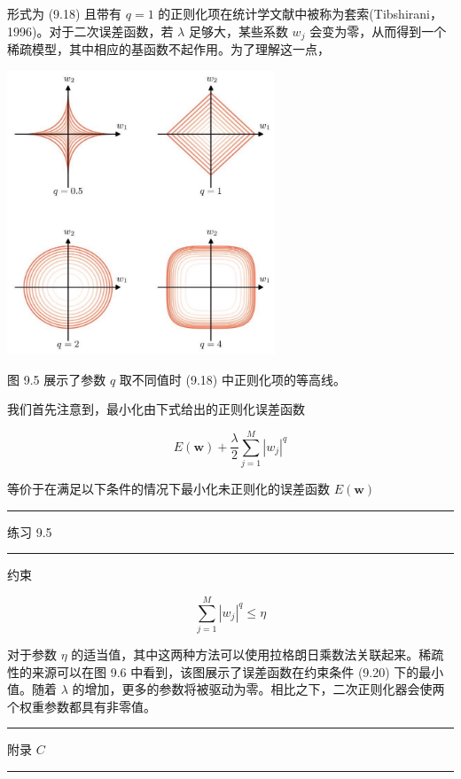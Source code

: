 \documentclass[10pt]{report}
\newcommand{\HRule}{\begin{center}\rule{0.9\linewidth}{0.2mm}\end{center}}
\begin{document}
形式为 (9.18) 且带有 \(q = 1\) 的正则化项在统计学文献中被称为套索(Tibshirani，1996)。对于二次误差函数，若 \(\lambda\) 足够大，某些系数 \({w}_{j}\) 会变为零，从而得到一个稀疏模型，其中相应的基函数不起作用。为了理解这一点，

\begin{center}
\includegraphics[max width=0.6\textwidth]{images/0194e279-9b28-703a-88f4-c3ac21e2010d_284_687_349_782_829_0.jpg}
\end{center}
\hspace*{3em} 

图 9.5 展示了参数 \(q\) 取不同值时 (9.18) 中正则化项的等高线。

我们首先注意到，最小化由下式给出的正则化误差函数

\[
E\left( \mathbf{w}\right)  + \frac{\lambda }{2}\mathop{\sum }\limits_{{j = 1}}^{M}{\left| {w}_{j}\right| }^{q} \tag{9.19}
\]

等价于在满足以下条件的情况下最小化未正则化的误差函数 \(E\left( \mathbf{w}\right)\)

\HRule

练习 9.5

\HRule

约束

\[
\mathop{\sum }\limits_{{j = 1}}^{M}{\left| {w}_{j}\right| }^{q} \leq  \eta  \tag{9.20}
\]

对于参数 \(\eta\) 的适当值，其中这两种方法可以使用拉格朗日乘数法关联起来。稀疏性的来源可以在图 9.6 中看到，该图展示了误差函数在约束条件 (9.20) 下的最小值。随着 \(\lambda\) 的增加，更多的参数将被驱动为零。相比之下，二次正则化器会使两个权重参数都具有非零值。

\HRule

附录 \(C\)

\HRule
\end{document}
